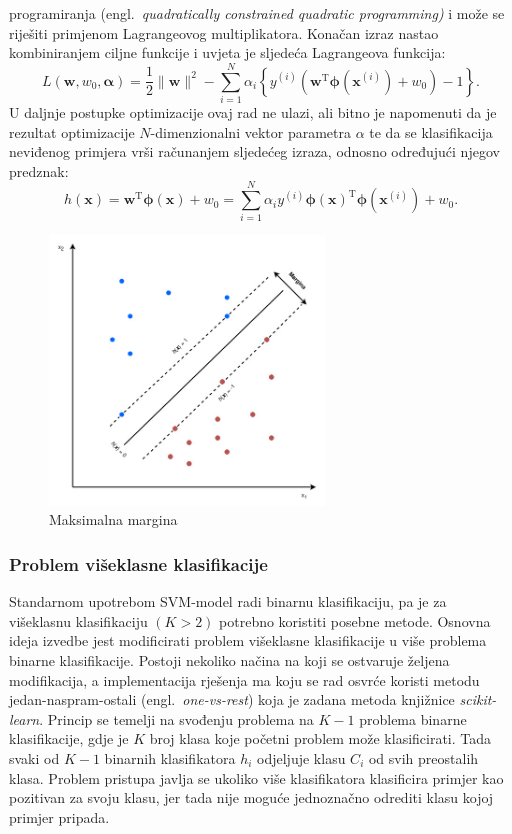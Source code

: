 \documentclass[times, utf8, zavrsni]{fer}
\begin{document}
programiranja (engl.~\emph{quadratically constrained quadratic programming)} i može se riješiti primjenom Lagrangeovog multiplikatora. Konačan izraz nastao kombiniranjem ciljne funkcije i uvjeta je sljedeća Lagrangeova funkcija: \[ L\left(\mathbf{w}, w_{0}, \boldsymbol{\alpha}\right)=\frac{1}{2}\|\mathbf{w}\|^{2}-\sum_{i=1}^{N} \alpha_{i}\left\{y^{(i)}\left(\mathbf{w}^{\mathrm{T}} \boldsymbol{\phi}\left(\mathbf{x}^{(i)}\right)+w_{0}\right)-1\right\} .\] U daljnje postupke optimizacije ovaj rad ne ulazi, ali bitno je napomenuti da je rezultat optimizacije $N$-dimenzionalni vektor parametra $\alpha$ te da se klasifikacija neviđenog primjera vrši računanjem sljedećeg izraza, odnosno određujući njegov predznak: \[ h(\mathbf{x})=\mathbf{w}^{\mathrm{T}} \boldsymbol{\phi}(\mathbf{x})+w_{0}=\sum_{i=1}^{N} \alpha_{i} y^{(i)} \boldsymbol{\phi}(\mathbf{x})^{\mathrm{T}} \boldsymbol{\phi}\left(\mathbf{x}^{(i)}\right)+w_{0}. \]

\begin{figure}
\centering
\includegraphics[width=0.65\textwidth]{svm2}
\caption{Maksimalna margina }
\label{svm_pic}
\end{figure}

\subsubsection{Problem višeklasne klasifikacije}

Standarnom upotrebom \gls{SVM}-model radi binarnu klasifikaciju, pa je za višeklasnu klasifikaciju $\left(K > 2\right)$ potrebno koristiti posebne metode. Osnovna ideja izvedbe jest modificirati problem višeklasne klasifikacije u više problema binarne klasifikacije. Postoji nekoliko načina na koji se ostvaruje željena modifikacija, a implementacija rješenja ma koju se rad osvrće koristi metodu jedan-naspram-ostali (engl.~\emph{one-vs-rest}) koja je zadana metoda knjižnice \emph{scikit-learn}. Princip se temelji na svođenju problema na $K - 1$ problema binarne klasifikacije, gdje je $K$ broj klasa koje početni problem može klasificirati. Tada svaki od $K-1$ binarnih klasifikatora $h_i$ odjeljuje klasu $C_i$ od svih preostalih klasa. Problem pristupa javlja se ukoliko više klasifikatora klasificira primjer kao pozitivan za svoju klasu, jer tada nije moguće jednoznačno odrediti klasu kojoj primjer pripada.
\end{document}
